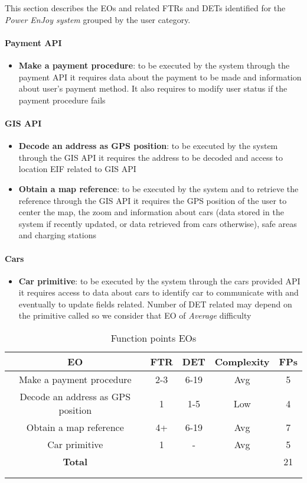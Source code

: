 This section describes the EOs and related FTRs and DETs identified for the \emph{Power EnJoy system} grouped by the user category.

\paragraph{Payment API}
\begin{itemize}
	\item \textbf{Make a payment procedure}: to be executed by the system through the payment API it requires data about the payment to be made and information about user's payment method. It also requires to modify user status if the payment procedure fails 
\end{itemize}

\paragraph{GIS API}
\begin{itemize}
	\item \textbf{Decode an address as GPS position}: to be executed by the system through the GIS API it requires the address to be decoded and access to location EIF related to GIS API
	\item \textbf{Obtain a map reference}: to be executed by the system and to retrieve the reference through the GIS API it requires the GPS position of the user to center the map, the zoom and information about cars (data stored in the system if recently updated, or data retrieved from cars otherwise), safe areas and charging stations
\end{itemize}

\paragraph{Cars}
\begin{itemize}
	\item \textbf{Car primitive}: to be executed by the system through the cars provided API it requires access to data about cars to identify car to communicate with and eventually to update fields related. Number of DET related may depend on the primitive called so we consider that EO of \emph{Average} difficulty
\end{itemize}

\clearpage 

\begin{longtable}{ccccc}
\toprule
\textbf{EO}	& FTR & DET & 	Complexity  & \textbf{FPs}\\
\midrule
Make a payment procedure & 2-3 & 6-19 & Avg & 5\\
\midrule
Decode an address as GPS position & 1 & 1-5 & Low & 4 \\
Obtain a map reference & 4+ & 6-19 & Avg & 7\\
\midrule
Car primitive & 1 & - & Avg & 5  \\
\midrule
\textbf{Total} & & & &  21\\
\bottomrule \\
\caption{Function points EOs}
\label{tbl:eoFP}
\end{longtable}


